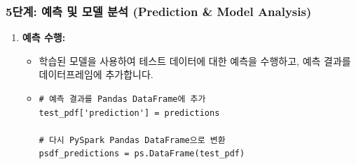 \documentclass[11pt,a4paper]{article}
\theoremstyle{definition}
\begin{document}
\subsubsection{5단계: 예측 및 모델 분석 (Prediction \& Model Analysis)}
\begin{enumerate}
    \item \textbf{예측 수행:}
    \begin{itemize}
        \item 학습된 모델을 사용하여 테스트 데이터에 대한 예측을 수행하고, 예측 결과를 데이터프레임에 추가합니다.
        \item 
        \begin{lstlisting}[caption=예측 수행 코드]
# 예측 결과를 Pandas DataFrame에 추가
test_pdf['prediction'] = predictions

# 다시 PySpark Pandas DataFrame으로 변환
psdf_predictions = ps.DataFrame(test_pdf)


\end{lstlisting}
\end{itemize}
\end{enumerate}
\end{document}
